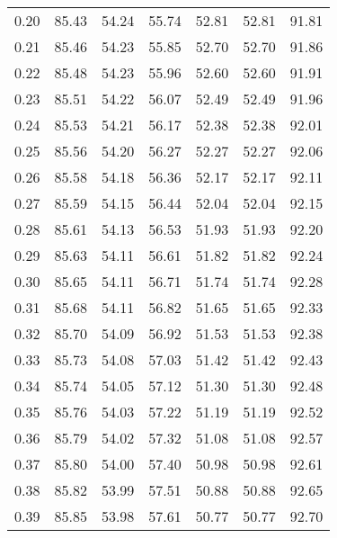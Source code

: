 \begin{tabular}{|c|c|c|c|c|c|c|}
      0.20 &     85.43 &     54.24 &      55.74 &   52.81 &      52.81 &         91.81 \\
      0.21 &     85.46 &     54.23 &      55.85 &   52.70 &      52.70 &         91.86 \\
      0.22 &     85.48 &     54.23 &      55.96 &   52.60 &      52.60 &         91.91 \\
      0.23 &     85.51 &     54.22 &      56.07 &   52.49 &      52.49 &         91.96 \\
      0.24 &     85.53 &     54.21 &      56.17 &   52.38 &      52.38 &         92.01 \\
      0.25 &     85.56 &     54.20 &      56.27 &   52.27 &      52.27 &         92.06 \\
      0.26 &     85.58 &     54.18 &      56.36 &   52.17 &      52.17 &         92.11 \\
      0.27 &     85.59 &     54.15 &      56.44 &   52.04 &      52.04 &         92.15 \\
      0.28 &     85.61 &     54.13 &      56.53 &   51.93 &      51.93 &         92.20 \\
      0.29 &     85.63 &     54.11 &      56.61 &   51.82 &      51.82 &         92.24 \\
      0.30 &     85.65 &     54.11 &      56.71 &   51.74 &      51.74 &         92.28 \\
      0.31 &     85.68 &     54.11 &      56.82 &   51.65 &      51.65 &         92.33 \\
      0.32 &     85.70 &     54.09 &      56.92 &   51.53 &      51.53 &         92.38 \\
      0.33 &     85.73 &     54.08 &      57.03 &   51.42 &      51.42 &         92.43 \\
      0.34 &     85.74 &     54.05 &      57.12 &   51.30 &      51.30 &         92.48 \\
      0.35 &     85.76 &     54.03 &      57.22 &   51.19 &      51.19 &         92.52 \\
      0.36 &     85.79 &     54.02 &      57.32 &   51.08 &      51.08 &         92.57 \\
      0.37 &     85.80 &     54.00 &      57.40 &   50.98 &      50.98 &         92.61 \\
      0.38 &     85.82 &     53.99 &      57.51 &   50.88 &      50.88 &         92.65 \\
      0.39 &     85.85 &     53.98 &      57.61 &   50.77 &      50.77 &         92.70 \\

\end{tabular}
